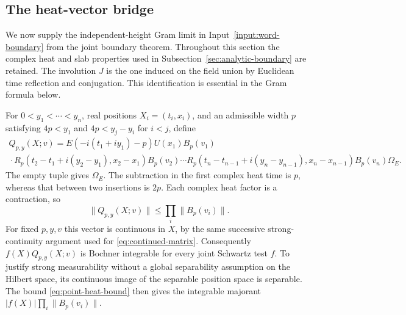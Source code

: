 \subsection{The heat-vector bridge}
\label{sec:heat-vectors}
We now supply the independent-height Gram limit in
Input~\ref{input:word-boundary} from the joint boundary theorem. Throughout
this section the complex heat and slab properties used in
Subsection~\ref{sec:analytic-boundary} are retained. The involution $J$ is the
one induced on the field union by Euclidean time reflection and conjugation.
This identification is essential in the Gram formula below.

For $0<y_1<\cdots<y_n$, real positions $X_i=(t_i,x_i)$, and an admissible
width $p$ satisfying $4p<y_1$ and $4p<y_j-y_i$ for $i<j$, define
\begin{multline}\label{eq:point-heat-vector}
 Q_{p,y}(X;v)=E(-i(t_1+iy_1)-p)U(x_1)B_p(v_1)\\
 {}\cdot R_p(t_2-t_1+i(y_2-y_1),x_2-x_1)B_p(v_2)\cdots
 R_p(t_n-t_{n-1}+i(y_n-y_{n-1}),x_n-x_{n-1})B_p(v_n)\Omega_E.
\end{multline}
The empty tuple gives $\Omega_E$. The subtraction in the first complex
heat time is $p$, whereas that between two insertions is $2p$.
Each complex heat factor is a contraction, so
\begin{equation}\label{eq:point-heat-bound}
 \|Q_{p,y}(X;v)\|\leq\prod_i\|B_p(v_i)\|.
\end{equation}
For fixed $p,y,v$ this vector is continuous in $X$, by the same successive
strong-continuity argument used for \eqref{eq:continued-matrix}. Consequently
$f(X)Q_{p,y}(X;v)$ is Bochner integrable for every joint Schwartz test $f$.
To justify strong measurability without a global separability assumption on
the Hilbert space, its continuous image of the separable position space is
separable. The bound \eqref{eq:point-heat-bound} then gives the integrable
majorant $|f(X)|\prod_i\|B_p(v_i)\|$.

